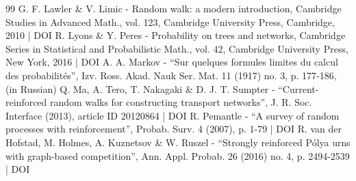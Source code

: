 \documentclass[10pt]{amsart}
\numberwithin{equation}{section}
\theoremstyle{definition}
\begin{document}
\begin{thebibliography}{99}
G. F. Lawler \& V. Limic - Random walk: a modern introduction, Cambridge Studies in Advanced Math., vol. 123, Cambridge University Press, Cambridge, 2010 | DOI
R. Lyons \& Y. Peres - Probability on trees and networks, Cambridge Series in Statistical and Probabilistic Math., vol. 42, Cambridge University Press, New York, 2016 | DOI
A. A. Markov - “Sur quelques formules limites du calcul des probabilités”, Izv. Ross. Akad. Nauk Ser. Mat. 11 (1917) no. 3, p. 177-186, (in Russian)
Q. Ma, A. Tero, T. Nakagaki \& D. J. T. Sumpter - “Current-reinforced random walks for constructing transport networks”, J. R. Soc. Interface (2013), article ID 20120864 | DOI
R. Pemantle - “A survey of random processes with reinforcement”, Probab. Surv. 4 (2007), p. 1-79 | DOI
R. van der Hofstad, M. Holmes, A. Kuznetsov \& W. Ruszel - “Strongly reinforced Pólya urns with graph-based competition”, Ann. Appl. Probab. 26 (2016) no. 4, p. 2494-2539 | DOI
\end{thebibliography}
\end{document}
